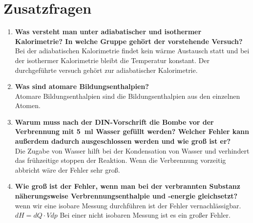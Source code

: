\section{Zusatzfragen}
	\begin{enumerate}
		\item \textbf{ Was versteht man unter adiabatischer und isothermer Kalorimetrie? In welche Gruppe gehört der  vorstehende Versuch?} \\
		Bei der adiabatischen Kalorimetrie findet kein wärme Austausch statt und bei der isothermer Kalorimetrie bleibt die Temperatur konstant. Der durchgeführte versuch gehört zur adiabatischer Kalorimetrie. 
		\item \textbf{ Was sind atomare Bildungsenthalpien?}\\
		Atomare Bildungsenthalpien sind die Bildungsenthalpien aus den einzelnen Atomen.
		\item \textbf{ Warum muss nach der DIN-Vorschrift die Bombe vor der Verbrennung mit 5\ ml Wasser gefüllt werden? Welcher Fehler kann außerdem dadurch ausgeschlossen werden und wie groß ist er?}\\
		Die Zugabe von Wasser hilft bei der Kondensation von Wasser und verhindert das frühzeitige stoppen der Reaktion. Wenn die Verbrennung vorzeitig abbricht wäre der Fehler sehr groß.   
		\item  \textbf{ Wie groß ist der Fehler, wenn man bei der verbrannten Substanz näherungsweise Verbrennungsenthalpie und -energie gleichsetzt?}\\
		wenn wir eine isobare Messung durchführen ist der Fehler vernachlässigbar.
		$dH = dQ \cdot Vdp$
		Bei einer nicht isobaren Messung ist es ein großer Fehler.
	\end{enumerate}
